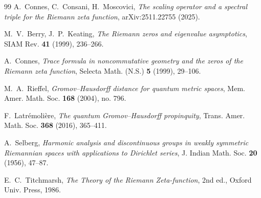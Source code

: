 \documentclass[12pt,a4paper]{article}
\begin{document}
\begin{thebibliography}{99}
A.~Connes, C.~Consani, H.~Moscovici,
\emph{The scaling operator and a spectral triple for the Riemann zeta function},
arXiv:2511.22755 (2025).

M.~V.~Berry, J.~P.~Keating,
\emph{The Riemann zeros and eigenvalue asymptotics},
SIAM Rev. \textbf{41} (1999), 236--266.

A.~Connes,
\emph{Trace formula in noncommutative geometry and the zeros of the Riemann zeta function},
Selecta Math. (N.S.) \textbf{5} (1999), 29--106.

M.~A.~Rieffel,
\emph{Gromov–Hausdorff distance for quantum metric spaces},
Mem. Amer. Math. Soc. \textbf{168} (2004), no. 796.

F.~Latr\'emoli\`ere,
\emph{The quantum Gromov–Hausdorff propinquity},
Trans. Amer. Math. Soc. \textbf{368} (2016), 365--411.

A.~Selberg,
\emph{Harmonic analysis and discontinuous groups in weakly symmetric Riemannian spaces with applications to Dirichlet series},
J. Indian Math. Soc. \textbf{20} (1956), 47--87.

E.~C.~Titchmarsh,
\emph{The Theory of the Riemann Zeta-function},
2nd ed., Oxford Univ. Press, 1986.
\end{thebibliography}
\end{document}
